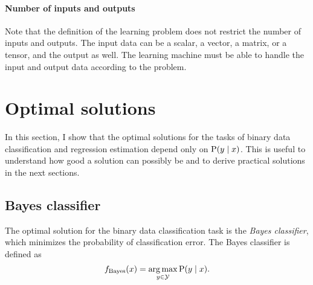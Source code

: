 \paragraph{Number of inputs and outputs}
Note that the definition of the learning problem does not restrict the number of inputs
and outputs.  The input data can be a scalar, a vector, a matrix, or a tensor, and the
output as well.  The learning machine must be able to handle the input and output data
according to the problem.


\section{Optimal solutions}
\label{sec:optimal-solution}

In this section, I show that the optimal solutions for the tasks of binary data
classification and regression estimation depend only on $\operatorname{P}(y \mid x)$.  This is useful
to understand how good a solution can possibly be and to derive practical solutions in the
next sections.

\subsection{Bayes classifier}

The optimal solution for the binary data classification task is the \emph{Bayes
classifier}, which minimizes the probability of classification error.  The Bayes
classifier is defined as
\begin{equation*}
  f_\text{Bayes}(x) = \operatorname*{arg\,max}_{y \in \mathcal{Y}} \operatorname{P}(y \mid x)\text{.}
\end{equation*}

